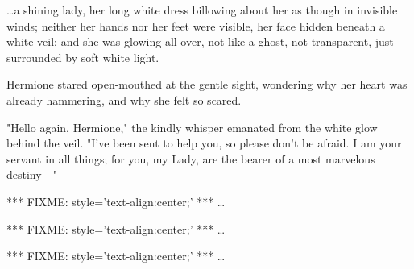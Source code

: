 {\ldots}a shining lady, her long white dress billowing about her as though in 
invisible winds; neither her hands nor her feet were visible, her face hidden 
beneath a white veil; and she was glowing all over, not like a ghost, not 
transparent, just surrounded by soft white light.

Hermione stared open-mouthed at the gentle sight, wondering why her heart was 
already hammering, and why she felt so scared.

"Hello again, Hermione," the kindly whisper emanated from the white glow behind 
the veil. "I've been sent to help you, so please don't be afraid. I am your 
servant in all things; for you, my Lady, are the bearer of a most marvelous 
destiny---"

*** FIXME: style='text-align:center;' ***
{\ldots}

*** FIXME: style='text-align:center;' ***
{\ldots}

*** FIXME: style='text-align:center;' ***
{\ldots}